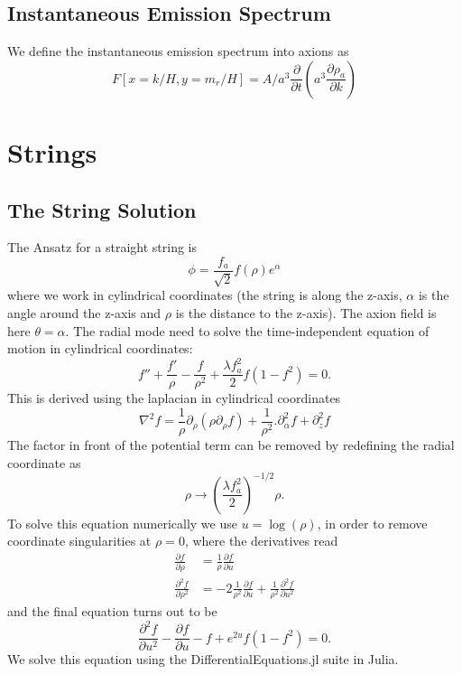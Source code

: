 \documentclass[a4paper]{article}
\begin{document}
\subsection{Instantaneous Emission Spectrum}
We define the instantaneous emission spectrum into axions as
\begin{equation}
    F[x = k / H, y = m_r / H] = A / a^3 \frac{\partial}{\partial t} \left( a^3 \frac{\partial \rho_a}{\partial k} \right)
\end{equation}

\newpage
\section{Strings}


\subsection{The String Solution}

The Ansatz for a straight string is
\begin{equation}
	\phi = \frac{f_a}{\sqrt{2}} f(\rho) e^{\alpha}
\end{equation}
where we work in cylindrical coordinates (the string is along the z-axis, $\alpha$ is the angle around the z-axis and $\rho$ is the distance to the z-axis).
The axion field is here $\theta = \alpha$.
The radial mode need to solve the time-independent equation of motion in cylindrical coordinates:
\begin{equation}
	\label{eq:radial_eq}
	f'' + \frac{f'}{\rho} - \frac{f}{\rho^2} + \frac{\lambda f_a^2}{2} f (1 - f^2) = 0.
\end{equation}
This is derived using the laplacian in cylindrical coordinates 
\begin{equation}
	\nabla^2 f = \frac{1}{\rho} \partial_\rho (\rho \partial_\rho f) + \frac{1}{\rho^2}. \partial_\alpha^2 f + \partial_z^2 f
\end{equation}
The factor in front of the potential term can be removed by redefining the radial coordinate 
as
\begin{equation}
	\rho \to \left( \frac{\lambda f_a^2}{2} \right)^{-1/2} \rho.
\end{equation}
To solve this equation numerically we use $u = \log(\rho)$, in order to remove coordinate singularities at $\rho = 0$, where the derivatives 
read
\begin{align}
	\frac{\partial f}{\partial \rho} &= \frac{1}{\rho} \frac{\partial f}{\partial u} \\
	\frac{\partial^2 f}{\partial \rho^2} &= - 2 \frac{1}{\rho^2} \frac{\partial f}{\partial u}  + \frac{1}{\rho^2} 	\frac{\partial^2 f}{\partial u^2} 
\end{align}
and the final equation turns out to be
\begin{equation}
	\frac{\partial^2 f}{\partial u^2} - \frac{\partial f}{\partial u} - f + e^{2u} f (1 - f^2) = 0.
\end{equation}
We solve this equation using the DifferentialEquations.jl suite in Julia.
\end{document}
